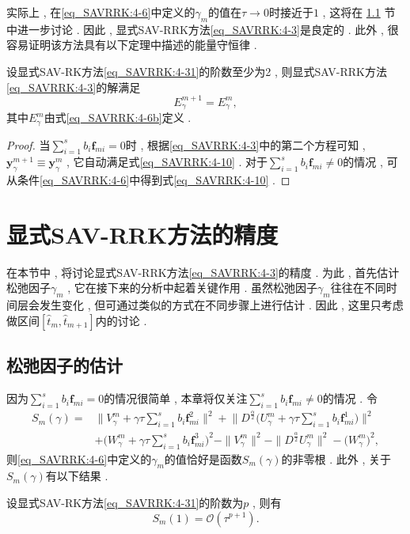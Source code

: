 实际上 , 在\eqref{eq_SAVRRK:4-6}中定义的$\gamma_m$的值在$\tau\rightarrow 0$时接近于$1$ , 这将在 \ref{Section_SAVRRK: 5-1} 节中进一步讨论 . 
因此 , 显式SAV-RRK方法\eqref{eq_SAVRRK:4-3}是良定的 . 此外 , 很容易证明该方法具有以下定理中描述的能量守恒律 . 
\newpage
\begin{theorem}
设显式SAV-RK方法\eqref{eq_SAVRRK:4-31}的阶数至少为2 , 则显式SAV-RRK方法\eqref{eq_SAVRRK:4-3}的解满足
\begin{equation}
E_{\gamma}^{m+1}=E_{\gamma}^{m} , \label{eq_SAVRRK:4-10}
\end{equation}
其中$E_{\gamma}^{m}$由式\eqref{eq_SAVRRK:4-6b}定义 . 
\end{theorem}

\begin{proof}
当$\sum\limits_{i=1}^s b_i \bm{f}_{m i}=0$时 , 根据\eqref{eq_SAVRRK:4-3}中的第二个方程可知 , $\bm{y}_\gamma^{m+1}\equiv\bm{y}_\gamma^m$ , 它自动满足式\eqref{eq_SAVRRK:4-10} . 
对于$\sum\limits_{i=1}^s b_i \bm{f}_{m i}\neq 0$的情况 , 可从条件\eqref{eq_SAVRRK:4-6}中得到式\eqref{eq_SAVRRK:4-10} . 

\end{proof}

\section{显式SAV-RRK方法的精度}\label{Section_SAVRRK: 5}
在本节中 , 将讨论显式SAV-RRK方法\eqref{eq_SAVRRK:4-3}的精度 . 为此 , 首先估计松弛因子$\gamma_m$ , 它在接下来的分析中起着关键作用 . 
虽然松弛因子$\gamma_m$往往在不同时间层会发生变化 , 但可通过类似的方式在不同步骤上进行估计 . 
因此 , 这里只考虑做区间$\left[\hat{t}_m , \hat{t}_{m+1}\right]$内的讨论 . 

\subsection{松弛因子的估计}\label{Section_SAVRRK: 5-1}

因为$\sum\limits_{i=1}^s b_i \bm{f}_{m i} = 0$的情况很简单 , 本章将仅关注$\sum\limits_{i=1}^s b_i \bm{f}_{m i} \neq 0$的情况 . 
令
\begin{equation}
\begin{aligned}\label{eq_SAVRRK:sm}
S_m(\gamma)=&\big\|V_\gamma^m+\gamma \tau \sum\limits_{i=1}^s b_i \bm{f}_{m i}^2\big\|^2 + \big\|D^\frac{\alpha}{2} \big(U_\gamma^m+\gamma \tau \sum\limits_{i=1}^s b_i \bm{f}_{m i}^1\big)\big\|^2\\
&+\big(W_\gamma^m+\gamma \tau \sum\limits_{i=1}^s b_i \bm{f}_{m i}^3\big)^2-\|V_\gamma^{m}\|^2 - \|D^\frac{\alpha}{2} U_\gamma^{m}\|^2-\big(W_\gamma^{m}\big)^2 , 
\end{aligned}
\end{equation}
则\eqref{eq_SAVRRK:4-6}中定义的$\gamma_m$的值恰好是函数$S_m(\gamma)$的非零根 . 
此外 , 关于$S_m(\gamma)$有以下结果 . 
\begin{lemma}\label{lem_SAVRRK:5_1}
设显式SAV-RK方法\eqref{eq_SAVRRK:4-31}的阶数为$p$ , 则有
\begin{equation}
S_m(1)=\mathcal{O}(\tau^{p+1}) . 
\end{equation}
\end{lemma}

